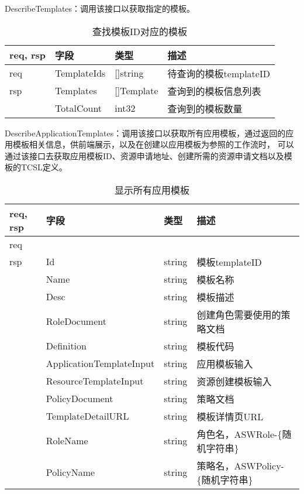 DescribeTemplates：调用该接口以获取指定的模板。
\begin{table}[H]
    \centering
    \caption{查找模板ID对应的模板}
    \label{tab:design-interface-template}
    \begin{tabular}{llll}
        \toprule
        req, rsp   & 字段 & 类型 & 描述 \\
        \midrule
        req & TemplateIds & []string & 待查询的模板templateID \\ \hline
        rsp & Templates & []Template & 查询到的模板信息列表 \\
        & TotalCount & int32 & 查询到的模板数量 \\
        \bottomrule
    \end{tabular}
\end{table}


DescribeApplicationTemplates：调用该接口以获取所有应用模板，通过返回的应用模板相关信息，供前端展示，以及在创建以应用模板为参照的工作流时，
可以通过该接口去获取应用模板ID、资源申请地址、创建所需的资源申请文档以及模板的TCSL定义。
\begin{table}[H]
    \centering
    \caption{显示所有应用模板}
    \label{tab:design-interface-app-template}
    \begin{tabular}{llll}
        \toprule
        req, rsp   & 字段 & 类型 & 描述 \\
        \midrule
        req &&&\\ \hline
        rsp & Id & string & 模板templateID\\
        & Name & string & 模板名称\\
        & Desc & string & 模板描述\\
        & RoleDocument & string & 创建角色需要使用的策略文档\\
        & Definition & string & 模板代码\\
        & ApplicationTemplateInput & string & 应用模板输入\\
        & ResourceTemplateInput & string & 资源创建模板输入\\
        & PolicyDocument & string & 策略文档\\
        & TemplateDetailURL & string & 模板详情页URL\\
        & RoleName & string & 角色名，ASWRole-\{随机字符串\}\\
        & PolicyName & string & 策略名，ASWPolicy-\{随机字符串\}\\

        \bottomrule
    \end{tabular}
\end{table}


